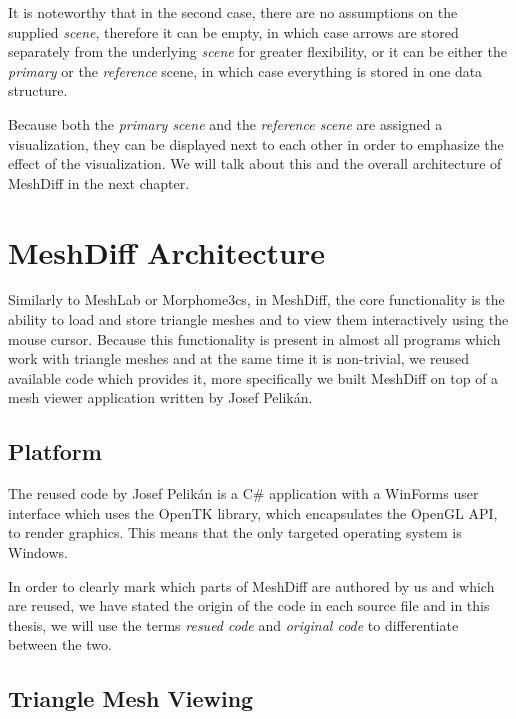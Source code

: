 It is noteworthy that in the second case, there are no assumptions on the supplied {\it scene}, therefore it can be empty, in which case arrows are stored separately from the underlying {\it scene} for greater flexibility, or it can be either the {\it primary} or the {\it reference} scene, in which case everything is stored in one data structure.

Because both the {\it primary scene} and the {\it reference scene} are assigned a visualization, they can be displayed next to each other in order to emphasize the effect of the visualization. We will talk about this and the overall architecture of MeshDiff in the next chapter.
\section{MeshDiff Architecture}

Similarly to MeshLab or Morphome3cs, in MeshDiff, the core functionality is the ability to load and store triangle meshes and to view them interactively using the mouse cursor. Because this functionality is present in almost all programs which work with triangle meshes and at the same time it is non-trivial, we reused available code which provides it, more specifically we built MeshDiff on top of a mesh viewer application written by Josef Pelikán.

\subsection{Platform}

The reused code by Josef Pelikán is a C\# application with a WinForms user interface which uses the OpenTK library, which encapsulates the OpenGL API, to render graphics. This means that the only targeted operating system is Windows.

In order to clearly mark which parts of MeshDiff are authored by us and which are reused, we have stated the origin of the code in each source file and in this thesis, we will use the terms {\it resued code} and {\it original code} to differentiate between the two.

\subsection{Triangle Mesh Viewing}

